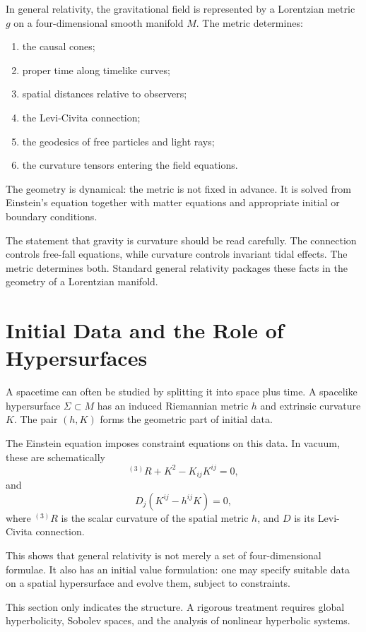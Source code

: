 In general relativity, the gravitational field is represented by a Lorentzian
metric \(g\) on a four-dimensional smooth manifold \(M\). The metric determines:
\begin{enumerate}
    \item the causal cones;
    \item proper time along timelike curves;
    \item spatial distances relative to observers;
    \item the Levi-Civita connection;
    \item the geodesics of free particles and light rays;
    \item the curvature tensors entering the field equations.
\end{enumerate}

The geometry is dynamical: the metric is not fixed in advance. It is solved from
Einstein's equation together with matter equations and appropriate initial or
boundary conditions.

The statement that gravity is curvature should be read carefully. The connection
controls free-fall equations, while curvature controls invariant tidal effects.
The metric determines both. Standard general relativity packages these facts in
the geometry of a Lorentzian manifold.

\clearpage

\section{Initial Data and the Role of Hypersurfaces}

A spacetime can often be studied by splitting it into space plus time. A
spacelike hypersurface \(\Sigma\subset M\) has an induced Riemannian metric
\(h\) and extrinsic curvature \(K\). The pair \((h,K)\) forms the geometric part
of initial data.

The Einstein equation imposes constraint equations on this data. In vacuum,
these are schematically
\[
{}^{(3)}R+K^2-K_{ij}K^{ij}=0,
\]
and
\[
D_j(K^{ij}-h^{ij}K)=0,
\]
where \({}^{(3)}R\) is the scalar curvature of the spatial metric \(h\), and
\(D\) is its Levi-Civita connection.

This shows that general relativity is not merely a set of four-dimensional
formulae. It also has an initial value formulation: one may specify suitable
data on a spatial hypersurface and evolve them, subject to constraints.

This section only indicates the structure. A rigorous treatment requires global
hyperbolicity, Sobolev spaces, and the analysis of nonlinear hyperbolic systems.


